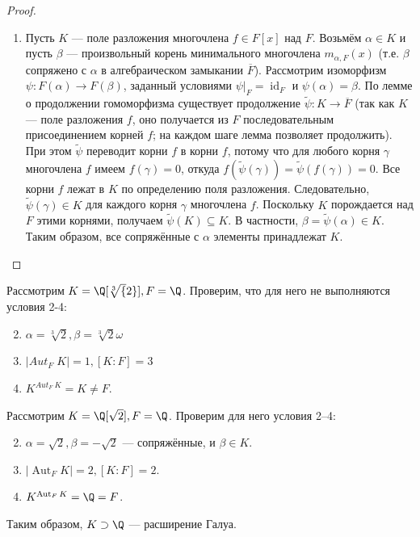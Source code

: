 \begin{proof}
\begin{enumerate}
        \item[\((1) \Ra (2)\)] Пусть \(K\) — поле разложения многочлена \(f \in F[x]\) над \(F\). Возьмём \(\alpha \in K\) и пусть \(\beta\) — произвольный корень минимального многочлена \(m_{\alpha,F}(x)\) (т.е. \(\beta\) сопряжено с \(\alpha\) в алгебраическом замыкании \(\overline{F}\)). Рассмотрим изоморфизм \(\psi: F(\alpha) \to F(\beta)\), заданный условиями \(\psi|_F = \operatorname{id}_F\) и \(\psi(\alpha) = \beta\). По лемме о продолжении гомоморфизма существует продолжение \(\widetilde{\psi}: K \to \overline{F}\) (так как \(K\) — поле разложения \(f\), оно получается из \(F\) последовательным присоединением корней \(f\); на каждом шаге лемма позволяет продолжить). При этом \(\widetilde{\psi}\) переводит корни \(f\) в корни \(f\), потому что для любого корня \(\gamma\) многочлена \(f\) имеем \(f(\gamma)=0\), откуда \(f(\widetilde{\psi}(\gamma)) = \widetilde{\psi}(f(\gamma)) = 0\). Все корни \(f\) лежат в \(K\) по определению поля разложения. Следовательно, \(\widetilde{\psi}(\gamma) \in K\) для каждого корня \(\gamma\) многочлена \(f\). Поскольку \(K\) порождается над \(F\) этими корнями, получаем \(\widetilde{\psi}(K) \subseteq K\). В частности, \(\beta = \widetilde{\psi}(\alpha) \in K\). Таким образом, все сопряжённые с \(\alpha\) элементы принадлежат \(K\).
    \end{enumerate}
\end{proof}

\begin{example}
    Рассмотрим \(K = \Q[\sqrt[3]{2}], F = \Q\). Проверим, что для него не выполняются условия 2-4:
    \begin{enumerate}
        \setcounter{enumi}{1}
        \item \(\alpha = \sqrt[3]{2}, \beta = \sqrt[3]{2}\omega\)
        \item \(|Aut_F\;K| = 1, [K:F] = 3\)
        \item \(K^{Aut_F\:K} = K \ne F\).
    \end{enumerate}
\end{example}

\begin{example}
    Рассмотрим \(K = \Q[\sqrt{2}], F = \Q\). Проверим для него условия 2–4:
    \begin{enumerate}
        \setcounter{enumi}{1}
        \item \(\alpha = \sqrt{2}, \beta = -\sqrt{2}\) — сопряжённые, и \(\beta \in K\).
        \item \(|\operatorname{Aut}_F K| = 2, [K:F] = 2\).
        \item \(K^{\operatorname{Aut}_F K} = \Q = F\).
    \end{enumerate}
    Таким образом, \(K \supset \Q\) — расширение Галуа.
\end{example}

